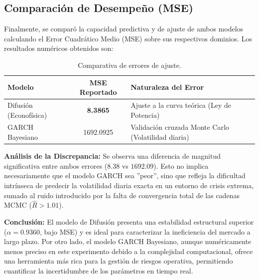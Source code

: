 \subsection{Comparación de Desempeño (MSE)}

Finalmente, se comparó la capacidad predictiva y de ajuste de ambos modelos calculando el Error Cuadrático Medio (MSE) sobre sus respectivos dominios. Los resultados numéricos obtenidos son:

\begin{table}[h!]
\centering
\begin{tabular}{|l|c|l|}
\hline
\textbf{Modelo} & \textbf{MSE Reportado} & \textbf{Naturaleza del Error} \\ \hline
Difusión (Econofísica) & \textbf{8.3865} & Ajuste a la curva teórica (Ley de Potencia) \\ \hline
GARCH Bayesiano & 1692.0925 & Validación cruzada Monte Carlo (Volatilidad diaria) \\ \hline
\end{tabular}
\caption{Comparativa de errores de ajuste.}
\label{tab:mse_results}
\end{table}

\textbf{Análisis de la Discrepancia:}
Se observa una diferencia de magnitud significativa entre ambos errores ($8.38$ vs $1692.09$). Esto no implica necesariamente que el modelo GARCH sea ''peor'', sino que refleja la dificultad intrínseca de predecir la volatilidad diaria exacta en un entorno de crisis extrema, sumado al ruido introducido por la falta de convergencia total de las cadenas MCMC ($\hat{R} > 1.01$).

\textbf{Conclusión:}
El modelo de Difusión \cite{Alvarez2002} presenta una estabilidad estructural superior ($\alpha=0.9360$, bajo MSE) y es ideal para caracterizar la ineficiencia del mercado a largo plazo. Por otro lado, el modelo GARCH Bayesiano, aunque numéricamente menos preciso en este experimento debido a la complejidad computacional, ofrece una herramienta más rica para la gestión de riesgos operativa, permitiendo cuantificar la incertidumbre de los parámetros en tiempo real.